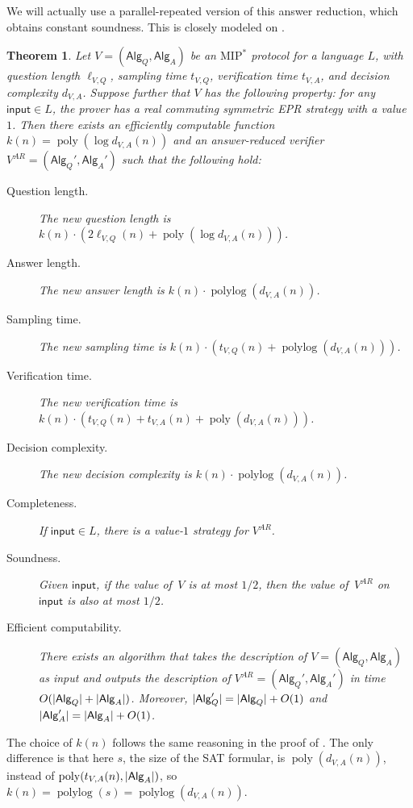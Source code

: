 \documentclass[11pt]{article}
\theoremstyle{plain}
\newtheorem{theorem}{Theorem}[section]
\theoremstyle{definition}
\DeclarePairedDelimiter{\abs}{\lvert}{\rvert}
\newcommand{\poly} {\ensuremath{\operatorname{poly}}}
\newcommand{\polylog} {\ensuremath{\operatorname{polylog}}}
\newcommand{\1}{\mathbb{1}} %
\newcommand{\ipt}{\mathsf{input}}
\newcommand{\Alg}{\mathsf{Alg}}
\newcommand{\MIP}{\mathrm{MIP}}
\begin{document}
We will actually use a parallel-repeated version of this answer reduction, which obtains constant soundness. This is closely modeled on \cite[Theorem 52]{10.1145/3564246.3585208}.
\begin{theorem}
\label{thm:newar-pr}
    Let $V = (\Alg_Q, \Alg_A)$ be an $\MIP^*$ protocol for a language $L$, with question length $\ell_{V,Q}$, sampling time $t_{V,Q}$, verification time $t_{V,A}$, and decision complexity $d_{V,A}$. 
    Suppose further that $V$ has the following property: for any $\ipt \in L$, the prover has a 
	real commuting symmetric EPR strategy with a value $1$.
    Then there exists an efficiently computable function $k(n) = \poly(\log d_{V,A}(n))$ and an answer-reduced verifier $V^{AR} = (\Alg_Q', \Alg_A')$
    such that the following hold:
    \begin{description}
        \item[Question length.] The new question length is $k(n) \cdot (2\ell_{V,Q}(n) + \poly(\log d_{V,A}(n)))$.
        \item[Answer length.] The new answer length is $k(n) \cdot \polylog( d_{V,A}(n))$.
        \item[Sampling time.] The new sampling time is $k(n) \cdot (t_{V,Q}(n) +\polylog (d_{V,A}(n)))$.
        \item[Verification time.] The new verification time is $k(n) \cdot (t_{V,Q}(n) + t_{V,A}(n)+ \poly(d_{V,A}(n)))$. 
        \item[Decision complexity.] The new decision complexity is $k(n) \cdot \polylog(d_{V,A}(n))$.
        \item[Completeness.] If $\ipt \in L$, there is a value-$1$ strategy for $V^{AR}$.
        \item[Soundness.] Given $\ipt$, if the value of $\,V$ is at most $1/2$, then the value of $\,V^{AR}$ on $\ipt$ is also at most $1/2$.
        \item[Efficient computability.] There exists an algorithm that takes the description of $V = (\Alg_Q, \Alg_A)$ as input and outputs the description of $V^{AR} = (\Alg_Q', \Alg_A')$ in time $O( \abs{\Alg_Q}+ \abs{\Alg_A})$.
        Moreover, $\abs{\Alg_Q'} = \abs{\Alg_Q} +O(1)$ and $\abs{\Alg_A'} = \abs{\Alg_A}+O(1)$.
    \end{description}
\end{theorem}
The choice of $k(n)$ follows the same reasoning in the proof of \cite[Theorem 52]{10.1145/3564246.3585208}. 
The only difference is that here $s$, the size of the SAT formular, is $\poly(d_{V,A}(n))$, instead of $\poly(t_{V,A}(n), \abs{\Alg_A})$, so $k(n) = \polylog(s) = \polylog(d_{V,A}(n))$.
\end{document}
